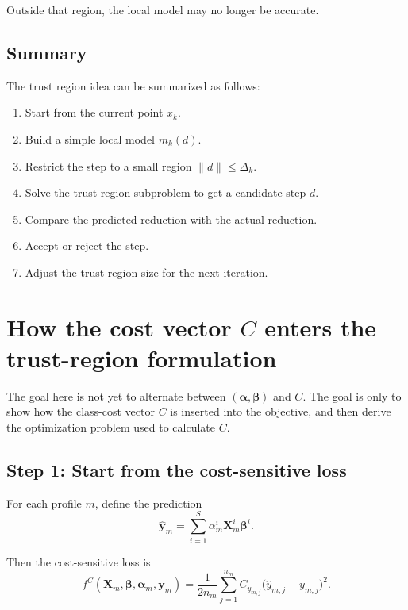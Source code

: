 \documentclass{article}
\begin{document}
Outside that region, the local model may no longer be accurate.

\subsection{Summary}

The trust region idea can be summarized as follows:
\begin{enumerate}
    \item Start from the current point $x_k$.
    \item Build a simple local model $m_k(d)$.
    \item Restrict the step to a small region $\|d\| \leq \Delta_k$.
    \item Solve the trust region subproblem to get a candidate step $d$.
    \item Compare the predicted reduction with the actual reduction.
    \item Accept or reject the step.
    \item Adjust the trust region size for the next iteration.
\end{enumerate}



\section{How the cost vector $C$ enters the trust-region formulation}

The goal here is not yet to alternate between $(\boldsymbol{\alpha},\boldsymbol{\beta})$ and $C$.  
The goal is only to show how the class-cost vector $C$ is inserted into the objective, and then derive the optimization problem used to calculate $C$.

\subsection{Step 1: Start from the cost-sensitive loss}

For each profile $m$, define the prediction
\begin{equation}
\hat{\mathbf y}_m
=
\sum_{i=1}^{S}\alpha_m^i \mathbf X_m^i \boldsymbol{\beta}^i.
\end{equation}

Then the cost-sensitive loss is
\begin{equation}
f^C(\mathbf X_m,\boldsymbol{\beta},\boldsymbol{\alpha}_m,\mathbf y_m)
=
\frac{1}{2n_m}
\sum_{j=1}^{n_m}
C_{y_{m,j}}
\big(\hat y_{m,j}-y_{m,j}\big)^2.
\end{equation}
\end{document}
